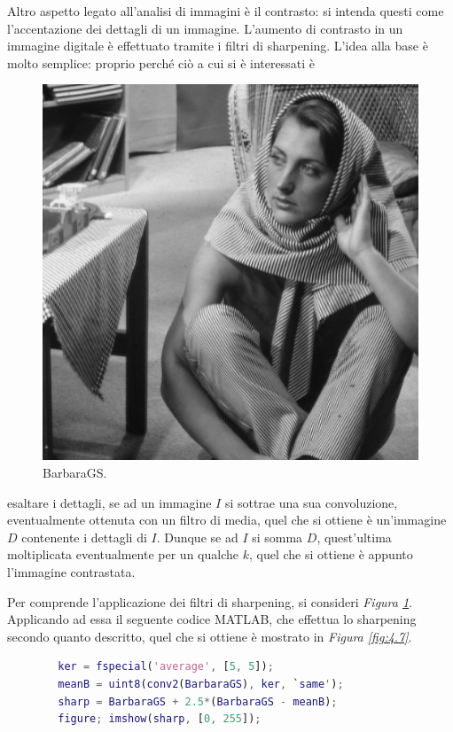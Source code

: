 \documentclass{subfiles}
\begin{document}
Altro aspetto legato all'analisi di immagini è il contrasto: si intenda questi come l'accentazione dei dettagli di un immagine.
L'aumento di contrasto in un immagine digitale è effettuato tramite i filtri di sharpening.
L'idea alla base è molto semplice: proprio perché ciò a cui si è interessati è
\begin{figure}
    \centering
    \includegraphics[scale = 0.325]{../Images/Barbara/BarbaraGS.png}
    \caption{BarbaraGS.}
    \label{fig:4.6}
\end{figure}
esaltare i dettagli, se ad un immagine \(I\) si sottrae una sua convoluzione,
eventualmente ottenuta con un filtro di media, quel che si ottiene è un'immagine \(D\) contenente i dettagli di \(I\). Dunque se ad \(I\) si somma \(D\),
quest'ultima moltiplicata eventualmente per un qualche \(k\), quel che si ottiene è appunto l'immagine contrastata.

Per comprende l'applicazione dei filtri di sharpening, si consideri \emph{Figura \ref{fig:4.6}}.
Applicando ad essa il seguente codice MATLAB, che effettua lo sharpening secondo quanto descritto, quel che si ottiene è mostrato in \emph{Figura \ref{fig:4.7}}.
\begin{center}
    \begin{lstlisting}[language = MATLAB]
        % caricamento di BarbaraGS.png
        ker = fspecial('average', [5, 5]);
        meanB = uint8(conv2(BarbaraGS), ker, `same');
        sharp = BarbaraGS + 2.5*(BarbaraGS - meanB);
        figure; imshow(sharp, [0, 255]);
    \end{lstlisting}
\end{center}
\end{document}
